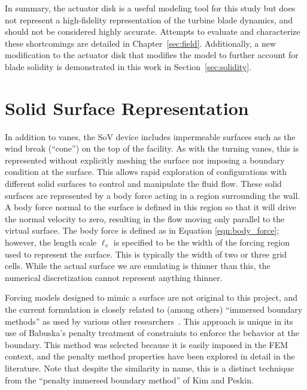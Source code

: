 In summary, the actuator disk is a useful modeling tool for this study
but does not represent a high-fidelity representation of the turbine
blade dynamics, and should not be considered highly accurate. Attempts
to evaluate and characterize these shortcomings are detailed in
Chapter~\ref{sec:field}.  Additionally, a new modification to the
actuator disk that modifies the model to further account for blade
solidity is demonstrated in this work in Section~\ref{sec:solidity}. 

\section{Solid Surface Representation}
\label{subsec:solid_surface}

In addition to vanes, the SoV device includes impermeable surfaces
such as the wind break (``cone'') on the top of the facility. As with
the turning vanes, this is represented without explicitly meshing the
surface nor imposing  a boundary condition at the surface. This allows
rapid exploration of configurations  with different solid surfaces to
control and manipulate the fluid flow. These solid surfaces are
represented by a body force acting in a region surrounding the wall. 
A body force normal to the surface is defined in this region so
that it will drive the normal velocity to zero, resulting in the flow
moving only parallel to the virtual surface. 
The body force is defined as in Equation
\ref{eqn:body_force}; however, the length scale $\ell_v$ is specified to
be the width of the forcing region used to represent the surface. This is
typically the width of two or three grid cells. While the actual surface we are
emulating is thinner than this, the numerical discretization 
cannot represent anything thinner. 

Forcing models designed to mimic a surface are not original to this
 project, and the current formulation is  closely related to (among others)
``immersed boundary methods'' as used by various other
researchers~\cite{doi:10.1146/annurev.fluid.37.061903.175743,verzicco1998complex}. This
approach is unique in its use of Babuska's penalty treatment of
constraints\cite{1973fempen,ZAMM:ZAMM19880680925} to enforce the
behavior at the boundary. This method was selected because it is easily
imposed in the FEM context, and the penalty method properties have been
explored in detail in the literature.
Note that despite the similarity in name, this is a distinct technique
from the ``penalty immersed boundary method'' of Kim and
Peskin\cite{:/content/aip/journal/pof2/19/5/10.1063/1.2734674}.  

